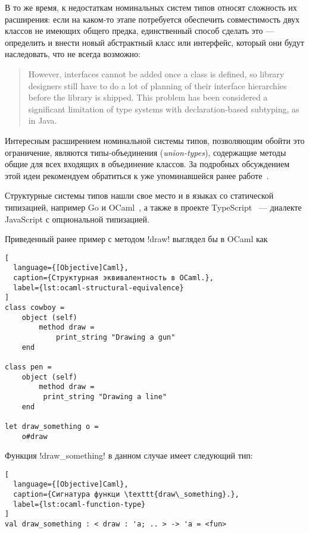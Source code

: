 В то же время, к недостаткам номинальных систем типов относят сложность их
расширения: если на каком-то этапе потребуется обеспечить совместимость двух
классов не имеющих общего предка, единственный способ сделать это --- определить
и внести новый абстрактный класс или интерфейс, который они будут наследовать,
что не всегда возможно:

\begin{quote}
However, interfaces cannot be added once a class is defined, so library
designers still have to do a lot of planning of their interface hierarchies
before the library is shipped. This problem has been considered a significant
limitation of type systems with declaration-based subtyping, as in Java.
\end{quote}

Интересным расширением номинальной системы типов, позволяющим обойти это
ограничение, являются типы-объединения (\emph{union-types}), содержащие методы
общие для всех входящих в объединение классов. За подробных обсуждением этой
идеи рекомендуем обратиться к уже упоминавшейся ранее
работе~\cite[]{Igarashi2006}.

Структурные системы типов нашли свое место и в языках со статической
типизацией, например Go и OCaml~\cite[с.~33]{Ocaml}, а также в проекте
TypeScript~\cite[]{TypeScript} --- диалекте JavaScript с опциональной
типизацией. 

Приведенный ранее пример с методом !draw! выглядел бы в OCaml как

\begin{lstlisting}[
  language={[Objective]Caml},
  caption={Структурная эквивалентность в OCaml.},
  label={lst:ocaml-structural-equivalence}
]
class cowboy =
    object (self)
        method draw =
            print_string "Drawing a gun"
    end

class pen = 
    object (self) 
        method draw =
         print_string "Drawing a line"
    end

let draw_something o =
    o#draw

\end{lstlisting}

Функция !draw_something! в данном случае имеет следующий тип:

\begin{lstlisting}[
  language={[Objective]Caml},
  caption={Сигнатура функци \texttt{draw\_something}.},
  label={lst:ocaml-function-type}
]
val draw_something : < draw : 'a; .. > -> 'a = <fun>
\end{lstlisting}

